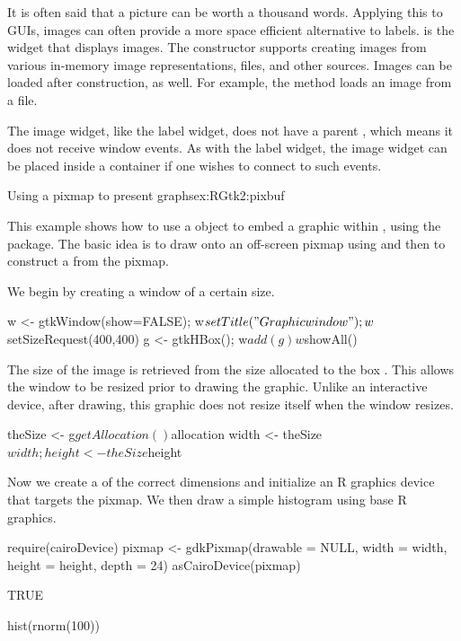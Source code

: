 It is often said that a picture can be worth a thousand
words. Applying this to GUIs, images can often provide a more space
efficient alternative to labels.  is the widget that
displays images. The constructor  supports
creating images from various in-memory image representations, files,
and other sources.  Images can be loaded after construction, as well. For example,
the  method loads an image from a file.

The image widget, like the label widget, does not have a parent
, which means it does not receive window events. As
with the label widget, the image widget can be placed inside a
 container if one wishes to connect to such
events.


\begin{example}{Using a pixmap to present graphs}{ex:RGtk2:pixbuf}





  This example shows how to use a  object to
  embed a graphic within , using the
   package. The basic idea is to draw onto an
  off-screen pixmap using  and
  then to construct a  from the pixmap. 

  We begin by creating a window of a certain size.
\begin{Schunk}
\begin{Sinput}
 w <- gtkWindow(show=FALSE); w$setTitle("Graphic window");
 w$setSizeRequest(400,400)
 g <- gtkHBox(); w$add(g)
 w$showAll()
\end{Sinput}
\end{Schunk}


The size of the image is retrieved from the size allocated to the box
. This allows the window to be resized prior to drawing the
graphic. Unlike an interactive device, after drawing, this graphic
does not resize itself when the window resizes.

\begin{Schunk}
\begin{Sinput}
 theSize <- g$getAllocation()$allocation
 width <- theSize$width; height <- theSize$height
\end{Sinput}
\end{Schunk}

Now we create a  of the correct dimensions and
initialize an R graphics device that targets the pixmap. We then draw
a simple histogram using base R graphics.
\begin{Schunk}
\begin{Sinput}
 require(cairoDevice)
 pixmap <- gdkPixmap(drawable = NULL, width = width, height = height,
                     depth = 24)
 asCairoDevice(pixmap)
\end{Sinput}
\begin{Soutput}
[1] TRUE
\end{Soutput}
\begin{Sinput}
 hist(rnorm(100))
\end{Sinput}
\end{Schunk}


\end{example}
